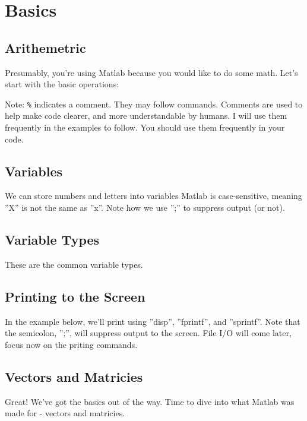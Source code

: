 
\section{Basics}

\subsection{Arithemetric}
Presumably, you're using Matlab because you would like to do some math.
 Let's start with the basic operations:

\begin{quote}

\end{quote}
\noindent Note: \texttt{\%} indicates a comment.
 They may follow commands.
 Comments are used to help make code clearer, and more understandable by humans.
 I will use them frequently in the examples to follow.
 You should use them frequently in your code.

\pagebreak
\subsection{Variables}
We can store numbers and letters into variables
 Matlab is case-sensitive, meaning ''X'' is not the same as ''x''.
 Note how we use '';'' to suppress output (or not).

\begin{quote}

\end{quote}

\pagebreak
\subsection{Variable Types}
These are the common variable types.

\begin{quote}

\end{quote}

\pagebreak
\subsection{Printing to the Screen}
In the example below, we'll print using
 ''disp'',
 ''fprintf'',
 and ''sprintf''.
 Note that the semicolon, '';'', will suppress output to the screen.
 File I/O will come later, focus now on the priting commands.
\begin{quote}

\end{quote}

\pagebreak
\subsection{Vectors and Matricies}
Great! We've got the basics out of the way.
 Time to dive into what Matlab was made for - vectors and matricies.

\begin{quote}

\end{quote}
